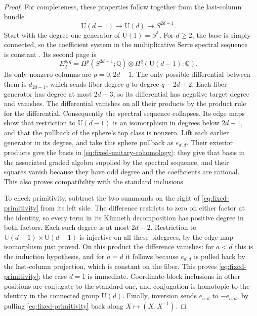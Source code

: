 \begin{proof}
For completeness, these properties follow together from the last-column
bundle
\[
 \mathrm U(d-1)\longrightarrow\mathrm U(d)
       \longrightarrow S^{2d-1}.
\]
Start with the degree-one generator of $\mathrm U(1)=S^1$.  For $d\geq2$,
the base is simply connected, so the coefficient system in the
multiplicative Serre spectral sequence is constant
\cite[Theorem~5.2 and Section~5.3]{McCleary2001}.  Its second page is
\[
 E_2^{p,q}=H^p(S^{2d-1};\mathbb Q)
              \otimes H^q(\mathrm U(d-1);\mathbb Q).
\]
Its only nonzero columns are $p=0,2d-1$.  The only possible differential
between them is $d_{2d-1}$, which sends fiber degree $q$ to degree
$q-2d+2$.  Each fiber generator has degree at most $2d-3$, so its
differential has negative target degree and vanishes.
The differential vanishes on all their products by the
product rule for the differential.  Consequently the spectral sequence
collapses.  Its edge maps show that restriction to $\mathrm U(d-1)$ is
an isomorphism in degrees below $2d-1$, and that the pullback of the sphere's
top class is nonzero.  Lift each earlier generator in its degree, and take
this sphere pullback as $e_{d,d}$.  Their exterior products give the basis
in \eqref{eq:fixed-unitary-cohomology}: they give that basis in the
associated graded algebra supplied by the spectral sequence, and their
squares vanish because they have odd degree and the coefficients are
rational.  This also proves compatibility with the standard inclusions.

To check primitivity, subtract the two summands on the right of
\eqref{eq:fixed-primitivity} from its left side.  The difference restricts
to zero on either factor at the identity, so every term in its K\"unneth
decomposition has positive degree in both factors.  Each such degree is
at most $2d-2$.  Restriction to
$\mathrm U(d-1)\times\mathrm U(d-1)$ is injective on all these
bidegrees, by the edge-map isomorphism just proved.  On this product the
difference vanishes: for $a<d$ this is the induction hypothesis, and for
$a=d$ it follows because $e_{d,d}$ is pulled back by the last-column
projection, which is constant on the fiber.
This proves \eqref{eq:fixed-primitivity}; the case $d=1$ is immediate.
Coordinate-block inclusions in other positions are conjugate to the
standard one, and conjugation is homotopic to the identity in the
connected group $\mathrm U(d)$.  Finally, inversion sends $e_{a,d}$
to $-e_{a,d}$, by pulling \eqref{eq:fixed-primitivity} back along
$X\mapsto(X,X^{-1})$.


\end{proof}
